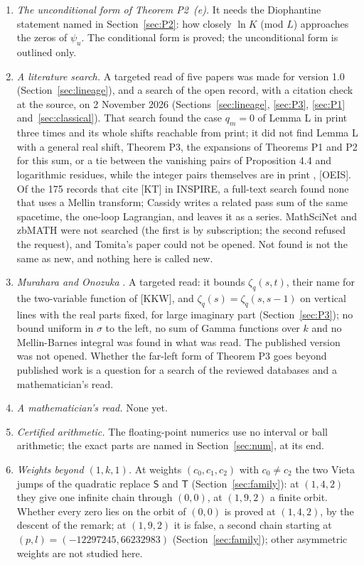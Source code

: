 \documentclass[11pt]{article}
\begin{document}
\begin{enumerate}
\item \emph{The unconditional form of Theorem P2~(e).} It needs the Diophantine statement named in Section~\ref{sec:P2}: how closely $\ln K$ (mod $L$) approaches the zeros of $\psi_u$. The conditional form is proved; the unconditional form is outlined only.
\item \emph{A literature search.} A targeted read of five papers was made for version 1.0 (Section~\ref{sec:lineage}), and a search of the open record, with a citation check at the source, on 2 November 2026 (Sections~\ref{sec:lineage}, \ref{sec:P3}, \ref{sec:P1} and~\ref{sec:classical}). That search found the case $q_m=0$ of Lemma L in print three times and its whole shifts reachable from print; it did not find Lemma L with a general real shift, Theorem P3, the expansions of Theorems P1 and P2 for this sum, or a tie between the vanishing pairs of Proposition 4.4 and logarithmic residues, while the integer pairs themselves are in print \cite{LS}, [OEIS]. Of the 175 records that cite [KT] in INSPIRE, a full-text search found none that uses a Mellin transform; Cassidy \cite[eq.~(37), page~13]{Ca} writes a related pass sum of the same spacetime, the one-loop Lagrangian, and leaves it as a series. MathSciNet and zbMATH were not searched (the first is by subscription; the second refused the request), and Tomita's paper \cite{To} could not be opened. Not found is not the same as new, and nothing here is called new.
\item \emph{Murahara and Onozuka} \cite{MO}. A targeted read: it bounds $\zeta_q(s,t)$, their name for the two-variable function of [KKW], and $\zeta_q(s)=\zeta_q(s,s-1)$ on vertical lines with the real parts fixed, for large imaginary part (Section~\ref{sec:P3}); no bound uniform in $\sigma$ to the left, no sum of Gamma functions over $k$ and no Mellin-Barnes integral was found in what was read. The published version \cite{MO} was not opened. Whether the far-left form of Theorem P3 goes beyond published work is a question for a search of the reviewed databases and a mathematician's read.
\item \emph{A mathematician's read.} None yet.
\item \emph{Certified arithmetic.} The floating-point numerics use no interval or ball arithmetic; the exact parts are named in Section~\ref{sec:num}, at its end.
\item \emph{Weights beyond $(1,k,1)$.} At weights $(c_0,c_1,c_2)$ with $c_0\ne c_2$ the two Vieta jumps of the quadratic replace $\mathsf{S}$ and $\mathsf{T}$ (Section~\ref{sec:family}): at $(1,4,2)$ they give one infinite chain through $(0,0)$, at $(1,9,2)$ a finite orbit. Whether every zero lies on the orbit of $(0,0)$ is proved at $(1,4,2)$, by the descent of the remark; at $(1,9,2)$ it is false, a second chain starting at $(p,l)=(-12297245,66232983)$ (Section~\ref{sec:family}); other asymmetric weights are not studied here.

\end{enumerate}
\end{document}
